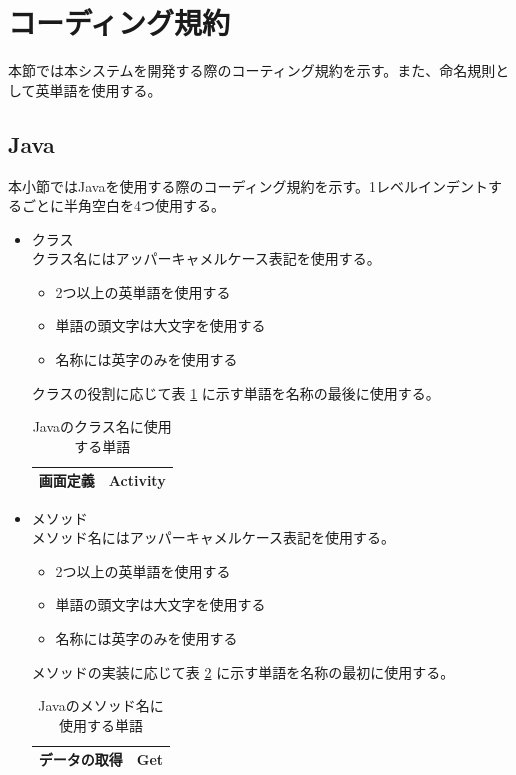 \documentclass[a4j]{jarticle}
\begin{document}
\section{コーディング規約}

本節では本システムを開発する際のコーティング規約を示す。また、命名規則として英単語を使用する。
\subsection{Java}

本小節ではJavaを使用する際のコーディング規約を示す。1レベルインデントするごとに半角空白を4つ使用する。
\begin{itemize}
	\item クラス\\
		クラス名にはアッパーキャメルケース表記を使用する。
	\begin{itemize}
		\item 2つ以上の英単語を使用する
		\item 単語の頭文字は大文字を使用する
		\item 名称には英字のみを使用する
	\end{itemize}
		クラスの役割に応じて表 \ref{tab:o1} に示す単語を名称の最後に使用する。
		\begin{table}[H]
			\caption{Javaのクラス名に使用する単語}
			\label{tab:o1}
			\begin{center}
			\begin{tabular}{|c|c|}
			\hline
			画面定義 & Activity\\\hline
			\end{tabular}
			\end{center}
			\end{table}
	\item メソッド\\
		メソッド名にはアッパーキャメルケース表記を使用する。
	\begin{itemize}
		\item 2つ以上の英単語を使用する
		\item 単語の頭文字は大文字を使用する
		\item 名称には英字のみを使用する
	\end{itemize}
		メソッドの実装に応じて表 \ref {tab:o2} に示す単語を名称の最初に使用する。
				\begin{table}[H]
			\caption{Javaのメソッド名に使用する単語}
			\label{tab:o2}
			\begin{center}
			\begin{tabular}{|c|c|}
			\hline
			データの取得 & Get\\\hline

\end{tabular}
\end{center}
\end{table}
\end{itemize}
\end{document}
